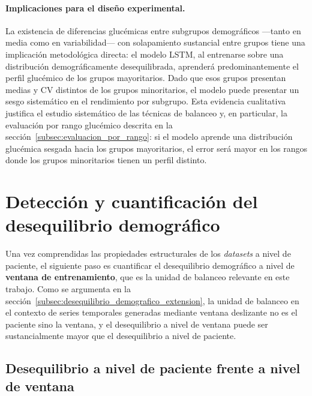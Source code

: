 \paragraph{Implicaciones para el diseño experimental.}
La existencia de diferencias glucémicas entre subgrupos demográficos ---tanto
en media como en variabilidad--- con solapamiento sustancial entre grupos
tiene una implicación metodológica directa: el modelo LSTM, al entrenarse
sobre una distribución demográficamente desequilibrada, aprenderá
predominantemente el perfil glucémico de los grupos mayoritarios. Dado
que esos grupos presentan medias y CV distintos de los grupos minoritarios,
el modelo puede presentar un sesgo sistemático en el rendimiento por
subgrupo. Esta evidencia cualitativa justifica el estudio sistemático
de las técnicas de balanceo y, en particular, la evaluación por rango
glucémico descrita en la sección~\ref{subsec:evaluacion_por_rango}: si
el modelo aprende una distribución glucémica sesgada hacia los grupos
mayoritarios, el error será mayor en los rangos donde los grupos
minoritarios tienen un perfil distinto.


\section{Detección y cuantificación del desequilibrio demográfico}
\label{sec:deteccion_imbalance}
Una vez comprendidas las propiedades estructurales de los \textit{datasets} a nivel de paciente, el siguiente paso es cuantificar el desequilibrio demográfico a nivel de \textbf{ventana de entrenamiento}, que es la unidad de balanceo relevante en este trabajo. Como se argumenta en la sección~\ref{subsec:desequilibrio_demografico_extension}, la unidad de balanceo en el contexto de series temporales generadas mediante ventana deslizante no es el paciente sino la ventana, y el desequilibrio a nivel de ventana puede ser sustancialmente mayor que el desequilibrio a nivel de paciente.

\subsection{Desequilibrio a nivel de paciente frente a nivel de ventana}
\label{subsec:imbalance_paciente_vs_ventana}

